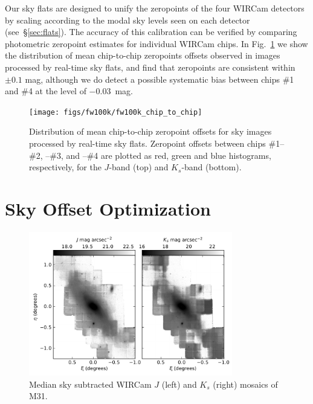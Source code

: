 \documentclass[iop]{emulateapj}
\newcommand{\mycomment}[1]{\textcolor{OliveGreen}{\textit{#1}}} %
\newcommand{\Fig}[1]{Fig.~\ref{fig:#1}}  %
\newcommand{\Sec}[1]{\S\ref{sec:#1}}  %
\begin{document}
Our sky flats are designed to unify the zeropoints of the four WIRCam detectors by scaling according to the modal sky levels seen on each detector (see~\Sec{flats}).
The accuracy of this calibration can be verified by comparing photometric zeropoint estimates for individual WIRCam chips.
In \Fig{fw100k_chip_to_chip} we show the distribution of mean chip-to-chip zeropoints offsets observed in images processed by real-time sky flats, and find that zeropoints are consistent within $\pm 0.1$ mag, although we do detect a possible systematic bias between chips \#1 and \#4 at the level of $-0.03$~mag.

\begin{figure}[t]
\centering
\texttt{[image: figs/fw100k/fw100k\_chip\_to\_chip]}
\caption{Distribution of mean chip-to-chip zeropoint offsets for sky images processed by real-time sky flats. Zeropoint offsets between chips \#1--\#2, --\#3, and --\#4 are plotted as
red, green and blue histograms, respectively, for the $J$-band (top) and $K_s$-band (bottom).}
\label{fig:fw100k_chip_to_chip}
\end{figure}

\section{Sky Offset Optimization}
\label{sec:scalar}

\begin{figure}[t]
\centering
\includegraphics[width=3.5in]{figs/raw_mosaics}
\caption{Median sky subtracted WIRCam $J$ (left) and $K_s$ (right) mosaics of M31.}
\label{fig:raw_mosaics}
\end{figure}
\end{document}
